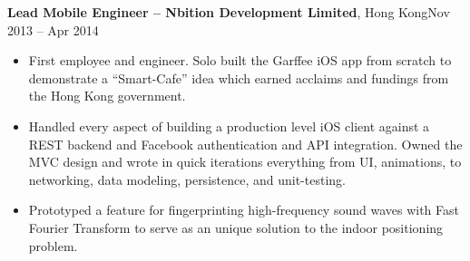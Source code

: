 \documentclass[margin,line]{res}
\begin{document}
\begin{resume}
  {\bf Lead Mobile Engineer -- Nbition Development Limited}, Hong Kong\hfill Nov 2013 -- Apr 2014
  \vspace{.05in}
  \begin{itemize}
  \item First employee and engineer. Solo built the Garffee iOS app from scratch
        to demonstrate a ``Smart-Cafe'' idea which earned acclaims and fundings
        from the Hong Kong government.
  \item Handled every aspect of building a production level iOS client against a
        REST backend and Facebook authentication and API integration. Owned the
        MVC design and wrote in quick iterations everything from UI, animations,
        to networking, data modeling, persistence, and unit-testing.
  \item Prototyped a feature for fingerprinting high-frequency sound waves with
        Fast Fourier Transform to serve as an unique solution to the indoor
        positioning problem.
  \end{itemize}


\end{resume}
\end{document}
